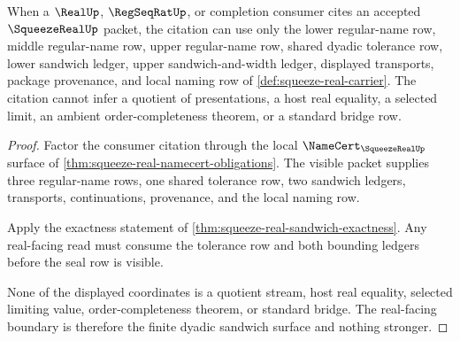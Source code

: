 \begin{theorem}
\label{thm:squeeze-real-realup-boundary}
When a $\RealUp$, $\RegSeqRatUp$, or completion consumer cites an accepted $\SqueezeRealUp$ packet, the citation can use only the lower regular-name row, middle regular-name row, upper regular-name row, shared dyadic tolerance row, lower sandwich ledger, upper sandwich-and-width ledger, displayed transports, package provenance, and local naming row of \autoref{def:squeeze-real-carrier}. The citation cannot infer a quotient of presentations, a host real equality, a selected limit, an ambient order-completeness theorem, or a standard bridge row.
\end{theorem}
\begin{proof}
Factor the consumer citation through the local $\NameCert_{\SqueezeRealUp}$ surface of \autoref{thm:squeeze-real-namecert-obligations}. The visible packet supplies three regular-name rows, one shared tolerance row, two sandwich ledgers, transports, continuations, provenance, and the local naming row.

Apply the exactness statement of \autoref{thm:squeeze-real-sandwich-exactness}. Any real-facing read must consume the tolerance row and both bounding ledgers before the seal row is visible.

None of the displayed coordinates is a quotient stream, host real equality, selected limiting value, order-completeness theorem, or standard bridge. The real-facing boundary is therefore the finite dyadic sandwich surface and nothing stronger.
\end{proof}

